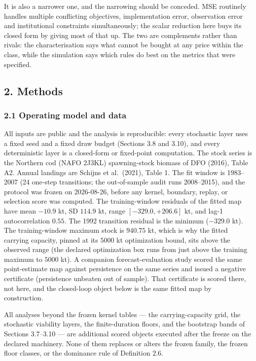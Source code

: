 \documentclass[11pt]{article}
\begin{document}
It is also a narrower one, and the narrowing should be conceded. MSE routinely handles
multiple conflicting objectives, implementation error, observation error and institutional
constraints simultaneously; the scalar reduction here buys its closed form by giving most of
that up. The two are complements rather than rivals: the characterisation says what cannot be
bought at any price within the class, while the simulation says which rules do best on the
metrics that were specified.

\subsection{2. Methods}\label{budget-methods}

\subsubsection{2.1 Operating model and
data}\label{budget-operating-model-and-data}

All inputs are public and the analysis is reproducible: every stochastic
layer uses a fixed seed and a fixed draw budget (Sections 3.8 and 3.10),
and every deterministic layer is a closed-form or fixed-point
computation. The stock
series is the Northern cod (NAFO 2J3KL) spawning-stock biomass of DFO
(2016), Table A2. Annual landings are Schijns et al.~(2021), Table 1.
The fit window is 1983--2007 (24 one-step transitions; the out-of-sample
audit runs 2008--2015), and the protocol was frozen on 2026-08-26,
before any kernel, boundary, replay, or selection score was computed.
The training-window residuals of the fitted map have mean \(-10.9\) kt,
SD \(114.9\) kt, range \([-329.0, +206.6]\) kt, and lag-1
autocorrelation \(0.55\). The 1992 transition residual is the minimum
(\(-329.0\) kt). The training-window maximum stock is \(940.75\) kt,
which is why the fitted carrying capacity, pinned at its \(5000\) kt
optimization bound, sits above the observed range (the declared
optimization box runs from just above the training maximum to \(5000\)
kt). A companion forecast-evaluation study scored the same
point-estimate map against persistence on the same series and issued a
negative certificate (persistence unbeaten out of sample). That
certificate is scored there, not here, and the closed-loop object below
is the same fitted map by construction.

All analyses beyond the frozen kernel tables --- the carrying-capacity
grid, the stochastic viability layers, the finite-duration floors, and
the bootstrap bands of Sections 3.7--3.10 --- are additional scored
objects executed after the freeze on the declared machinery. None of
them replaces or alters the frozen family, the frozen floor classes, or
the dominance rule of Definition 2.6.
\end{document}
